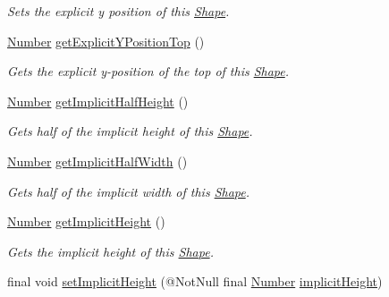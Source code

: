 \begin{DoxyCompactItemize}
\begin{DoxyCompactList}\small\item\em Sets the explicit y position of this \hyperlink{classcom_1_1aarrelaakso_1_1drawl_1_1_shape}{Shape}. \end{DoxyCompactList}\item 
\hyperlink{interfacecom_1_1aarrelaakso_1_1drawl_1_1_number}{Number} \hyperlink{classcom_1_1aarrelaakso_1_1drawl_1_1_shape_a8c65dff2026744ae10648de3908165e5}{get\+Explicit\+Y\+Position\+Top} ()
\begin{DoxyCompactList}\small\item\em Gets the explicit y-\/position of the top of this \hyperlink{classcom_1_1aarrelaakso_1_1drawl_1_1_shape}{Shape}. \end{DoxyCompactList}\item 
\hyperlink{interfacecom_1_1aarrelaakso_1_1drawl_1_1_number}{Number} \hyperlink{classcom_1_1aarrelaakso_1_1drawl_1_1_shape_a4af0fd7e309ea01bced73076510ef897}{get\+Implicit\+Half\+Height} ()
\begin{DoxyCompactList}\small\item\em Gets half of the implicit height of this \hyperlink{classcom_1_1aarrelaakso_1_1drawl_1_1_shape}{Shape}. \end{DoxyCompactList}\item 
\hyperlink{interfacecom_1_1aarrelaakso_1_1drawl_1_1_number}{Number} \hyperlink{classcom_1_1aarrelaakso_1_1drawl_1_1_shape_a02d73887a309bcd1178b142ad0c7edd9}{get\+Implicit\+Half\+Width} ()
\begin{DoxyCompactList}\small\item\em Gets half of the implicit width of this \hyperlink{classcom_1_1aarrelaakso_1_1drawl_1_1_shape}{Shape}. \end{DoxyCompactList}\item 
\hyperlink{interfacecom_1_1aarrelaakso_1_1drawl_1_1_number}{Number} \hyperlink{classcom_1_1aarrelaakso_1_1drawl_1_1_shape_a3b0ad73b41fe8c9ae66d20f7fc1de7c9}{get\+Implicit\+Height} ()
\begin{DoxyCompactList}\small\item\em Gets the implicit height of this \hyperlink{classcom_1_1aarrelaakso_1_1drawl_1_1_shape}{Shape}. \end{DoxyCompactList}\item 
final void \hyperlink{classcom_1_1aarrelaakso_1_1drawl_1_1_shape_a608e72be0fb16380e5fda14564c46739}{set\+Implicit\+Height} (@Not\+Null final \hyperlink{interfacecom_1_1aarrelaakso_1_1drawl_1_1_number}{Number} \hyperlink{classcom_1_1aarrelaakso_1_1drawl_1_1_shape_a9270317569c41e7f3f3fbe6e71df86e6}{implicit\+Height})

\end{DoxyCompactItemize}
